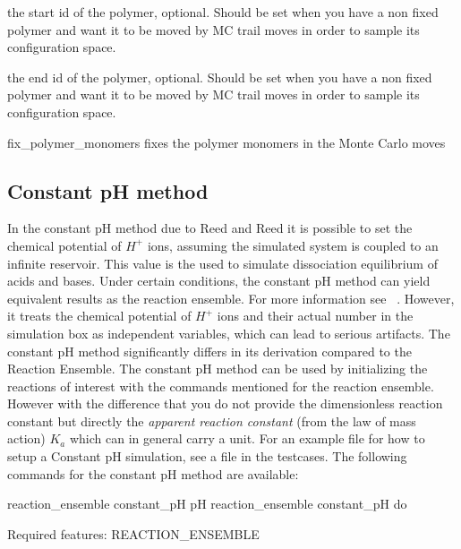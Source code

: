 \begin{arguments}
\item[\var{polymer\_start\_id}] the start id of the polymer, optional. Should be set when you have a non fixed polymer and want it to be moved by MC trail moves in order to sample its configuration space.
\item[\var{polymer\_end\_id}] the end id of the polymer, optional. Should be set when you have a non fixed polymer and want it to be moved by MC trail moves in order to sample its configuration space.
\item[fix\_polymer\_monomers] fixes the polymer monomers in the Monte Carlo moves
\end{arguments}

\subsection{Constant pH method}
In the constant pH method due to Reed and Reed \cite{reed92a} 
it is possible to set the chemical potential of $H^{+}$ ions, assuming
the simulated system is coupled to an infinite reservoir.
This value is the used to simulate dissociation equilibrium of acids and bases.
Under certain conditions, the constant pH method can yield equivalent
results as the reaction ensemble. For more information see ~\cite{landsgesell2016b}. 
However, it treats the chemical potential of $H^{+}$ ions and their
actual number in the simulation box as independent 
variables, which can lead to serious artifacts.
The constant pH method significantly differs in its derivation compared to the Reaction Ensemble.
The constant pH method can be used by initializing the reactions of interest with the commands
mentioned for the reaction ensemble. However with the difference that you do
not provide the dimensionless reaction constant but directly the
\textit{apparent reaction constant} (from the law of mass action) $K_a$ which
can in general carry a unit. For an example file for how to setup a Constant pH simulation, see a file in the testcases. The following commands for the constant pH method are available:
\begin{essyntax}
	 reaction_ensemble constant_pH pH 
	 reaction_ensemble constant_pH do
	
	Required features: REACTION_ENSEMBLE
\end{essyntax}

